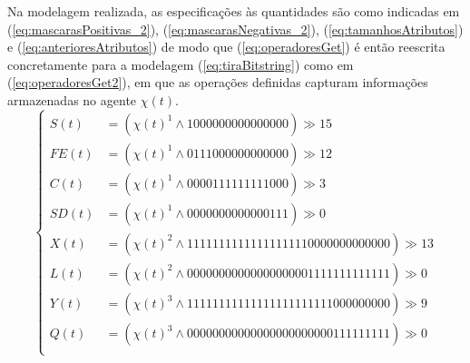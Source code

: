 Na modelagem realizada, as especificações às quantidades são como indicadas em (\ref{eq:mascarasPositivas_2}), (\ref{eq:mascarasNegativas_2}), (\ref{eq:tamanhosAtributos}) e (\ref{eq:anterioresAtributos}) de modo que (\ref{eq:operadoresGet}) é então reescrita concretamente para a modelagem (\ref{eq:tiraBitstring}) como em (\ref{eq:operadoresGet2}), em que as operações definidas capturam informações armazenadas no agente $\chi(t)$.
\begin{equation}
 \begin{cases}
 S(t)  &= (\chi(t)^1\wedge 1000000000000000) \gg 15 \\
 FE(t) &= (\chi(t)^1\wedge 0111000000000000) \gg 12 \\ 
 C(t)  &= (\chi(t)^1\wedge 0000111111111000) \gg 3  \\
 SD(t) &= (\chi(t)^1\wedge 0000000000000111) \gg 0  \\

 X(t)  &= (\chi(t)^2\wedge 11111111111111111110000000000000) \gg 13 \\
 L(t)  &= (\chi(t)^2\wedge 00000000000000000001111111111111) \gg 0  \\
 
 Y(t)  &= (\chi(t)^3\wedge 11111111111111111111111000000000) \gg 9 \\
 Q(t)  &= (\chi(t)^3\wedge 00000000000000000000000111111111) \gg 0 \\
 \end{cases}
 \label{eq:operadoresGet2}
\end{equation}

